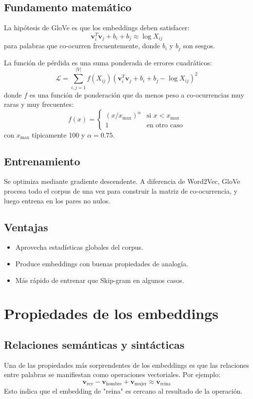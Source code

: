 \documentclass[12pt,a4paper,openany,oneside]{book}
\begin{document}
\subsection{Fundamento matemático}
La hipótesis de GloVe es que los embeddings deben satisfacer:
\[
\mathbf{v}_i^T \mathbf{v}_j + b_i + b_j \approx \log X_{ij}
\]
para palabras que co-ocurren frecuentemente, donde \(b_i\) y \(b_j\) son sesgos.

La función de pérdida es una suma ponderada de errores cuadráticos:
\[
\mathcal{L} = \sum_{i,j=1}^{|V|} f(X_{ij}) (\mathbf{v}_i^T \mathbf{v}_j + b_i + b_j - \log X_{ij})^2
\]
donde \(f\) es una función de ponderación que da menos peso a co-ocurrencias muy raras y muy frecuentes:
\[
f(x) = \begin{cases}
(x / x_{\max})^\alpha & \text{si } x < x_{\max} \\
1 & \text{en otro caso}
\end{cases}
\]
con \(x_{\max}\) típicamente 100 y \(\alpha = 0.75\).

\subsection{Entrenamiento}
Se optimiza mediante gradiente descendente. A diferencia de Word2Vec, GloVe procesa todo el corpus de una vez para construir la matriz de co-ocurrencia, y luego entrena en los pares no nulos.

\subsection{Ventajas}
\begin{itemize}
    \item Aprovecha estadísticas globales del corpus.
    \item Produce embeddings con buenas propiedades de analogía.
    \item Más rápido de entrenar que Skip-gram en algunos casos.
\end{itemize}

\section{Propiedades de los embeddings}

\subsection{Relaciones semánticas y sintácticas}
Una de las propiedades más sorprendentes de los embeddings es que las relaciones entre palabras se manifiestan como operaciones vectoriales. Por ejemplo:
\[
\mathbf{v}_{\text{rey}} - \mathbf{v}_{\text{hombre}} + \mathbf{v}_{\text{mujer}} \approx \mathbf{v}_{\text{reina}}
\]
Esto indica que el embedding de "reina" es cercano al resultado de la operación.
\end{document}
